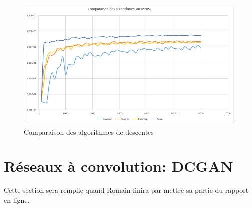 \begin{figure}[ht!]
  \includegraphics[width=\linewidth]{fig/comparaisonAlgos.png}
  \caption{Comparaison des algorithmes de descentes}
  \label{fig:comp_algos}
\end{figure}

\section{Réseaux à convolution: DCGAN}

Cette section sera remplie quand Romain finira par mettre sa partie du rapport en ligne.